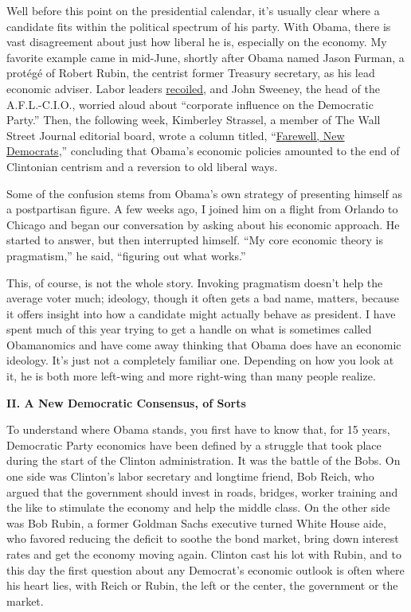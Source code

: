 Well before this point on the presidential calendar, it's usually clear
where a candidate fits within the political spectrum of his party. With
Obama, there is vast disagreement about just how liberal he is,
especially on the economy. My favorite example came in mid-June, shortly
after Obama named Jason Furman, a protégé of Robert Rubin, the centrist
former Treasury secretary, as his lead economic adviser. Labor leaders
\href{http://articles.latimes.com/2008/jun/11/nation/na-furman11}{recoiled},
and John Sweeney, the head of the A.F.L.-C.I.O., worried aloud about
``corporate influence on the Democratic Party.'' Then, the following
week, Kimberley Strassel, a member of The Wall Street Journal editorial
board, wrote a column titled,
``\href{http://www.wsj.com/public/article_print/SB121391937825890363.html}{Farewell,
New Democrats},'' concluding that Obama's economic policies amounted to
the end of Clintonian centrism and a reversion to old liberal ways.

Some of the confusion stems from Obama's own strategy of presenting
himself as a postpartisan figure. A few weeks ago, I joined him on a
flight from Orlando to Chicago and began our conversation by asking
about his economic approach. He started to answer, but then interrupted
himself. ``My core economic theory is pragmatism,'' he said, ``figuring
out what works.''

This, of course, is not the whole story. Invoking pragmatism doesn't
help the average voter much; ideology, though it often gets a bad name,
matters, because it offers insight into how a candidate might actually
behave as president. I have spent much of this year trying to get a
handle on what is sometimes called Obamanomics and have come away
thinking that Obama does have an economic ideology. It's just not a
completely familiar one. Depending on how you look at it, he is both
more left-wing and more right-wing than many people realize.

\textbf{II. A New Democratic Consensus, of Sorts}

To understand where Obama stands, you first have to know that, for 15
years, Democratic Party economics have been defined by a struggle that
took place during the start of the Clinton administration. It was the
battle of the Bobs. On one side was Clinton's labor secretary and
longtime friend, Bob Reich, who argued that the government should invest
in roads, bridges, worker training and the like to stimulate the economy
and help the middle class. On the other side was Bob Rubin, a former
Goldman Sachs executive turned White House aide, who favored reducing
the deficit to soothe the bond market, bring down interest rates and get
the economy moving again. Clinton cast his lot with Rubin, and to this
day the first question about any Democrat's economic outlook is often
where his heart lies, with Reich or Rubin, the left or the center, the
government or the market.

